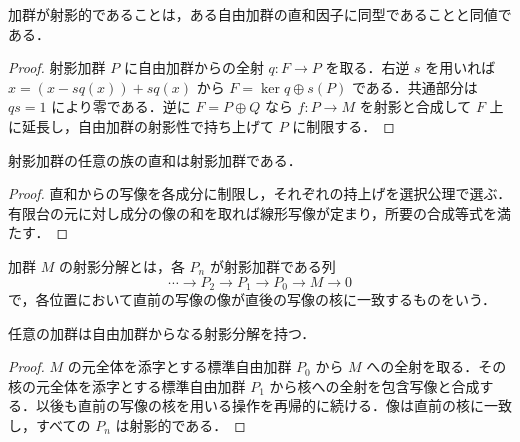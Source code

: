 \begin{prop}[自由加群の直和因子としての射影加群]
加群が射影的であることは，ある自由加群の直和因子に同型であることと同値である．
\end{prop}
\begin{proof}
射影加群 $P$ に自由加群からの全射 $q:F\to P$ を取る．右逆 $s$ を用いれば $x=(x-sq(x))+sq(x)$ から $F=\ker q\oplus s(P)$ である．共通部分は $qs=1$ により零である．逆に $F=P\oplus Q$ なら $f:P\to M$ を射影と合成して $F$ 上に延長し，自由加群の射影性で持ち上げて $P$ に制限する．
\end{proof}
\begin{prop}[射影加群の直和]
射影加群の任意の族の直和は射影加群である．
\end{prop}
\begin{proof}
直和からの写像を各成分に制限し，それぞれの持上げを選択公理で選ぶ．有限台の元に対し成分の像の和を取れば線形写像が定まり，所要の合成等式を満たす．
\end{proof}
\begin{defn}[射影分解]
加群 $M$ の射影分解とは，各 $P_n$ が射影加群である列
\[
\cdots\longrightarrow P_2\longrightarrow P_1\longrightarrow P_0\longrightarrow M\longrightarrow0
\]
で，各位置において直前の写像の像が直後の写像の核に一致するものをいう．
\end{defn}
\begin{prop}[射影分解の存在]
任意の加群は自由加群からなる射影分解を持つ．
\end{prop}
\begin{proof}
$M$ の元全体を添字とする標準自由加群 $P_0$ から $M$ への全射を取る．その核の元全体を添字とする標準自由加群 $P_1$ から核への全射を包含写像と合成する．以後も直前の写像の核を用いる操作を再帰的に続ける．像は直前の核に一致し，すべての $P_n$ は射影的である．
\end{proof}
